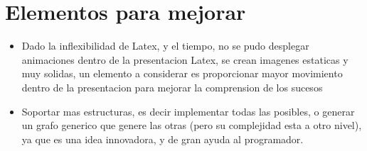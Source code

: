 \documentclass[12pt,letterpaper]{article}     %
\begin{document}
\section{Elementos para mejorar}

\begin{itemize}

\item Dado la inflexibilidad de Latex, y el tiempo, no se pudo desplegar animaciones dentro de la presentacion Latex, se crean imagenes estaticas y muy solidas, un elemento a considerar es proporcionar mayor movimiento dentro de la presentacion para mejorar la comprension de los sucesos

\item Soportar mas estructuras, es decir implementar todas las posibles, o generar un grafo generico que genere las otras (pero su complejidad esta a otro nivel), ya que es una idea innovadora, y de gran ayuda al programador.

\end{itemize} 
\end{document}
